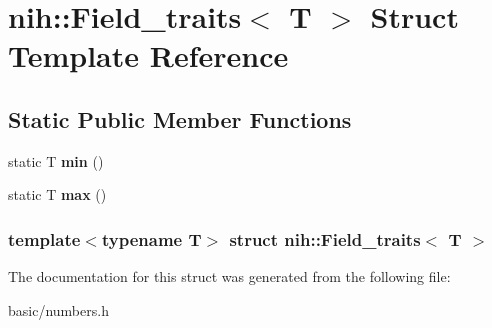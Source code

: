 \hypertarget{structnih_1_1_field__traits}{
\section{nih\-:\-:\-Field\-\_\-traits$<$ \-T $>$ \-Struct \-Template \-Reference}
\label{structnih_1_1_field__traits}
}
\subsection*{\-Static \-Public \-Member \-Functions}
\begin{DoxyCompactItemize}
\item 
\hypertarget{structnih_1_1_field__traits_a65b7bff62f01bb41980a384c68e21c18}{
static \-T {\bfseries min} ()}
\label{structnih_1_1_field__traits_a65b7bff62f01bb41980a384c68e21c18}

\item 
\hypertarget{structnih_1_1_field__traits_aba5164b6edfbcae7d2865db7c3f9febe}{
static \-T {\bfseries max} ()}
\label{structnih_1_1_field__traits_aba5164b6edfbcae7d2865db7c3f9febe}

\end{DoxyCompactItemize}
\subsubsection*{template$<$typename T$>$ struct nih\-::\-Field\-\_\-traits$<$ T $>$}



\-The documentation for this struct was generated from the following file\-:\begin{DoxyCompactItemize}
\item 
basic/numbers.\-h\end{DoxyCompactItemize}
